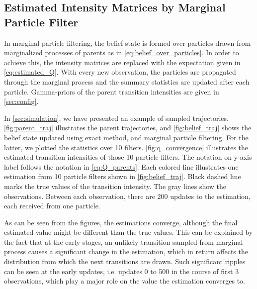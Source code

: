 \subsection{Estimated Intensity Matrices by Marginal Particle Filter}
In marginal particle filtering, the belief state is formed over particles drawn from marginalized processes of parents as in \autoref{eq:belief_over_particles}. In order to achieve this, the intensity matrices are replaced with the expectation given in \autoref{eq:estimated_Q}. With every new observation, the particles are propagated through the marginal process and the summary statistics are updated after each particle. Gamma-priors of the parent transition intensities are given in \cref{sec:config}. \par
In \cref{sec:simulation}, we have presented an example of sampled trajectories. \autoref{fig:parent_traj} illustrates the parent trajectories, and \autoref{fig:belief_traj} shows the belief state updated using exact method, and marginal particle filtering. For the latter, we plotted the statistics over 10 filters. \autoref{fig:q_convergence} illustrates the estimated transition intensities of those 10 particle filters. The notation on y-axis label follows the notation in \autoref{eq:Q_parents}. Each colored line illustrates one estimation from 10 particle filters shown in \autoref{fig:belief_traj}. Black dashed line marks the true values of the transition intensity. The gray lines show the observations. Between each observation, there are 200 updates to the estimation, each received from one particle. \par
As can be seen from the figures, the estimations converge, although the final estimated value might be different than the true values. This can be explained by the fact that at the early stages, an unlikely transition sampled from marginal process causes a significant change in the estimation, which in return affects the distribution from which the next transitions are drawn. Such significant ripples can be seen at the early updates, i.e. updates 0 to 500 in the course of first 3 observations, which play a major role on the value the estimation converges to.